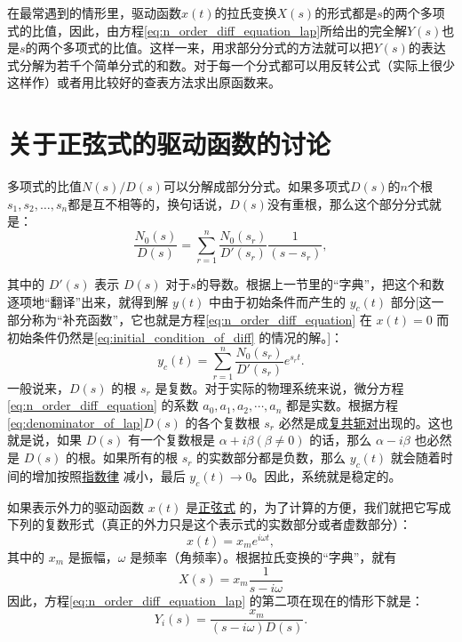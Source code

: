 在最常遇到的情形里，驱动函数$x(t)$的拉氏变换$X(s)$的形式都是$s$的两个多项式的比值，因此，由方程\eqref{eq:n_order_diff_equation_lap}所给出的完全解$Y(s)$也是$s$的两个多项式的比值。这样一来，用求部分分式的方法就可以把$Y(s)$的表达式分解为若千个简单分式的和数。对于每一个分式都可以用反转公式（实际上很少这样作）或者用比较好的查表方法求出原函数来。

\section{关于正弦式的驱动函数的讨论}\label{discuss_about_Sine_type_drive_function}

多项式的比值$N(s)/D(s)$可以分解成部分分式。如果多项式$D(s)$的$n$个根$s_1,s_2,…,s_n$都是互不相等的，换句话说，$D(s)$没有重根，那么这个部分分式就是：
\begin{equation}
\frac{N_0(s)}{D(s)} = \sum_{r=1}^n \frac{N_0(s_r)}{D'(s_r)} \frac{1}{(s - s_r)},\tag{*}
\end{equation}

其中的 $D'(s)$ 表示 $D(s)$ 对于$s$的导数。根据上一节里的“字典”，把这个和数逐项地“翻译”出来，就得到解 $y(t)$ 中由于初始条件而产生的 $y_c(t)$ 部分[这一部分称为“补充函数”，它也就是方程\eqref{eq:n_order_diff_equation} 在 $x(t)=0$ 而初始条件仍然是\eqref{eq:initial_condition_of_diff} 的情况的解。]：
\begin{equation}\label{eq:solution_yct}
y_c(t) = \sum_{r=1}^{n} \frac{N_0(s_r)}{D'(s_r)} e^{s_r t}.
\end{equation}
一般说来，$D(s)$ 的根 $s_r$ 是复数。对于实际的物理系统来说，微分方程\eqref{eq:n_order_diff_equation} 的系数 $a_0, a_1, a_2, \cdots, a_n$ 都是实数。根据方程\eqref{eq:denominator_of_lap}$D(s)$ 的各个复数根 $s_r$ 必然是成\underline{复共轭对}出现的。这也就是说，如果 $D(s)$ 有一个复数根是 $\alpha + i\beta (\beta \neq 0)$ 的话，那么 $\alpha - i\beta$ 也必然是 $D(s)$ 的根。如果所有的根 $s_r$ 的实数部分都是负数，那么 $y_c(t)$ 就会随着时间的增加按照\underline{指数律} 减小，最后 $y_c(t)\to 0$。因此，系统就是稳定的。

如果表示外力的驱动函数 $x(t)$ 是\underline{正弦式} 的，为了计算的方便，我们就把它写成下列的复数形式（真正的外力只是这个表示式的实数部分或者虚数部分）：
\begin{equation}\label{eq:driver_function_complex}
x(t) = x_m e^{i\omega t},
\end{equation}
其中的 $x_m$ 是振幅，$\omega$ 是频率（角频率）。根据拉氏变换的“字典”，就有
\begin{equation*}
X(s) = x_m \frac{1}{s-i\omega}
\end{equation*}
因此，方程\eqref{eq:n_order_diff_equation_lap} 的第二项在现在的情形下就是：
\begin{equation*}
Y_i(s) = \frac{x_m}{(s-i\omega)D(s)}.
\end{equation*}

